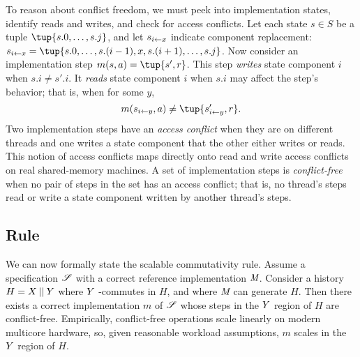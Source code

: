 To reason about conflict freedom, we must peek into
implementation states, identify reads and writes, and check for access
conflicts.
%
Let each state $s \in S$ be a tuple $\tup{s.0, \dots, s.j}$, and let
%
$s_{i\gets x}$ indicate component
replacement: $\tupleadj{s}{i}{x} = \tup{s.0,\dots,s.(i-1),x,s.(i+1),\dots,s.j}$.
%
Now consider an implementation step $m(s,a) = \tup{s', r}$.
%
This step \emph{writes} state component $i$
when $s.i \neq s'.i$.
%
It \emph{reads} state component $i$ when $s.i$ may affect the
step's behavior; that is, when for some $y$,
%
\[m(\tupleadj{s}{i}{y},a) \neq \tup{\tupleadj{s'}{i}{y}, r}.\]
%
Two implementation steps have an \emph{access conflict} when they are on
different threads and one writes a state component that the other either
writes or reads.
%
This notion of access conflicts maps directly onto read and write access
conflicts on real shared-memory machines.
%
A set of implementation steps is \emph{conflict-free}
when no pair of steps in the set has an access conflict; that is, no
thread's steps read or write a state component written by another
thread's steps.


\subsection{Rule}

We can now formally state the scalable commutativity rule.
%
Assume a specification $\mathscr{S}$ with a correct reference implementation
$\textit{M}$.
%
Consider a history $H = X \mathbin{||} Y$ where $Y$ \SIM-commutes in $H$,
and where $\textit{M}$ can generate $H$.
%
Then there exists a correct implementation $m$ of $\mathscr{S}$ whose steps in
the $Y$ region of $H$ are conflict-free.
%
Empirically, conflict-free operations scale linearly on modern
multicore hardware, so, given reasonable workload assumptions,
$m$ scales in the $Y$ region of $H$.




